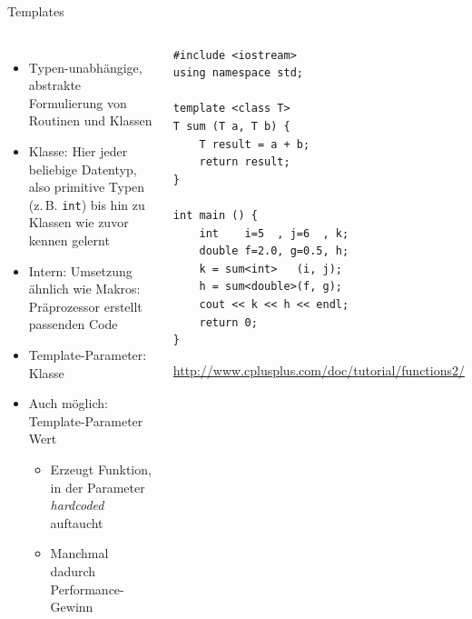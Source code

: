 \begin{frame}[fragile]{Templates}
%
\begin{columns}[T]
\begin{itemize}
\item Typen-unabhängige, abstrakte Formulierung von Routinen und Klassen
\item Klasse: Hier jeder beliebige Datentyp, also primitive Typen (z.\,B. \texttt{int}) bis hin zu
	Klassen wie zuvor kennen gelernt
\item Intern: Umsetzung ähnlich wie Makros: Präprozessor erstellt passenden Code
\item Template-Parameter: Klasse
\item Auch möglich: Template-Parameter Wert
	\begin{itemize}
	\item Erzeugt Funktion, in der Parameter \emph{hardcoded} auftaucht
	\item Manchmal dadurch Performance-Gewinn
	\end{itemize}
\end{itemize}
%
\vspace{-16pt}
\begin{codebox}
\begin{verbatim}
#include <iostream>
using namespace std;

template <class T>
T sum (T a, T b) {
    T result = a + b;
    return result;
}

int main () {
    int    i=5  , j=6  , k;
    double f=2.0, g=0.5, h;
    k = sum<int>   (i, j);
    h = sum<double>(f, g);
    cout << k << h << endl;
    return 0;
}
\end{verbatim}
\tiny \url{http://www.cplusplus.com/doc/tutorial/functions2/}
\vspace{-6pt}
\end{codebox}
\end{columns}
%
\end{frame}


